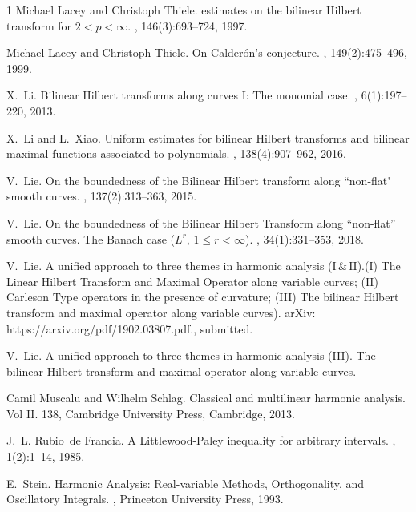 \documentclass{amsart}
\theoremstyle{definition}
\theoremstyle{remark}
\numberwithin{equation}{section}
\begin{document}
\begin{thebibliography}{1}
Michael Lacey and Christoph Thiele.
 estimates on the bilinear {H}ilbert transform for
  {$2<p<\infty$}.
, 146(3):693--724, 1997.

Michael Lacey and Christoph Thiele.
\newblock On {C}alder\'on's conjecture.
, 149(2):475--496, 1999.


X.~Li.
\newblock Bilinear {H}ilbert transforms along curves {I}: {T}he monomial case.
, 6(1):197--220, 2013.

X.~Li and L.~Xiao.
\newblock Uniform estimates for bilinear {H}ilbert transforms and bilinear
  maximal functions associated to polynomials.
, 138(4):907--962, 2016.

V.~Lie.
\newblock On the boundedness of the {B}ilinear {H}ilbert transform along
  ``non-flat" smooth curves.
, 137(2):313--363, 2015.

V.~Lie.
\newblock On the boundedness of the {B}ilinear {H}ilbert {T}ransform along
  ``non-flat'' smooth curves. {T}he {B}anach case ($L^r,\, 1\le r<\infty$).
, 34(1):331--353, 2018.

V.~Lie.
\newblock A unified approach to three themes in harmonic analysis (I$\,\&\,$II).(I) The Linear Hilbert Transform and Maximal Operator along variable curves; (II) Carleson Type operators in the presence of curvature; (III) The bilinear Hilbert transform and maximal operator along variable curves).
\newblock arXiv: https://arxiv.org/pdf/1902.03807.pdf., submitted.

V.~Lie.
\newblock A unified approach to three themes in harmonic analysis ({III}).
  {T}he bilinear {H}ilbert transform and maximal operator along variable
  curves.

Camil Muscalu and Wilhelm Schlag.
\newblock Classical and multilinear harmonic analysis. Vol II.
 138, Cambridge University Press,
Cambridge, 2013.

J.~L. Rubio~de Francia.
\newblock A {L}ittlewood-{P}aley inequality for arbitrary intervals.
, 1(2):1--14, 1985.

E.~Stein.
\newblock Harmonic Analysis: Real-variable Methods, Orthogonality, and
  Oscillatory Integrals.
, Princeton University Press, 1993.

\end{thebibliography}
\end{document}
